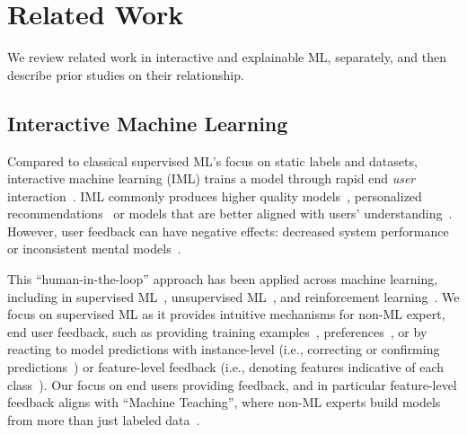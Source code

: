 \section{Related Work}
We review related work in interactive and explainable ML, separately, and then describe prior studies on their relationship. 

\subsection{Interactive Machine Learning}

Compared to classical supervised ML's focus on static labels and
datasets, interactive machine learning (IML) trains a model through rapid end \emph{user}
interaction~\cite{Amershi2014PowerLearning}.
%
IML commonly produces higher quality models~\cite{Settles2010ActiveSurvey, Raghavan2006ActiveInstances}, personalized recommendations~\cite{Amershi2012Regroup:Networks, Gowacka2013DirectingKeywords} or
models that are better aligned with users'
understanding~\cite{Andrzejewski2009IncorporatingPriors,
Lee2012IVisClustering:Modeling}.
%
However, user feedback can have negative effects: decreased system 
performance~\cite{Ahn2007OpenHarm, Wu2019LocalAnalysis} or 
inconsistent mental models~\cite{Bansal2019UpdatesTradeoff}.

This ``human-in-the-loop'' approach has been applied across machine
learning, including in supervised
ML~\cite{Fails2003InteractiveLearning, Settles2010ActiveSurvey},
unsupervised ML~\cite{Balcan2008ClusteringFeedback}, and reinforcement
learning~\cite{Knox2012ReinforcementTasks,
Saunders2018TrialIntervention}.
%
We focus on supervised ML as it provides intuitive mechanisms for non-ML expert, end user
feedback, such as providing training
examples~\cite{Fiebrink2009ALearning},
preferences~\cite{Resnick1994GroupLens:Netnews}, or by
reacting to model predictions with instance-level (i.e., correcting or
confirming predictions~\cite{Fails2003InteractiveLearning,
Culotta2006CorrectiveExtraction}) or feature-level feedback (i.e.,
denoting features indicative of each
class~\cite{Settles2011ClosingInstances,
Kulesza2015PrinciplesLearning, Raghavan2006ActiveInstances}). Our focus on end users providing feedback, and in particular feature-level feedback aligns with ``Machine Teaching'', where non-ML experts build models from more than just labeled data~\cite{Wall2019UsingTeaching}.

%

